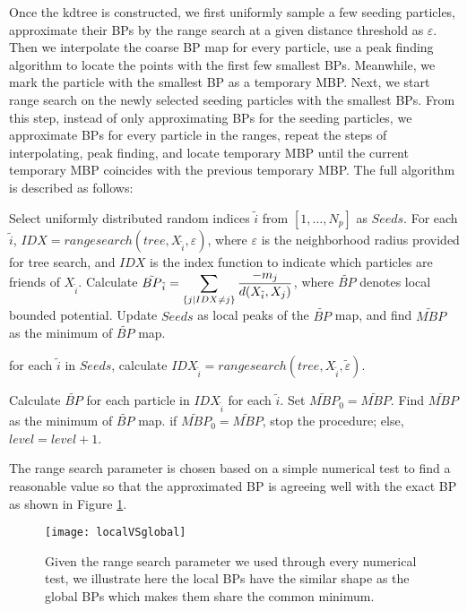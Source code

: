 Once the kdtree is constructed, we first uniformly sample a few seeding particles, approximate their BPs by the range search at a given distance threshold as $\varepsilon$. Then we interpolate the coarse BP map for every particle, use a peak finding algorithm to locate the points with the first few smallest BPs. Meanwhile, we mark the particle with the smallest BP as a temporary MBP. Next, we start range search on the newly selected seeding particles with the smallest BPs. From this step, instead of only approximating BPs for the seeding particles, we approximate BPs for every particle in the ranges, repeat the steps of interpolating, peak finding, and locate temporary MBP until the current temporary MBP coincides with the previous temporary MBP. The full algorithm is described as follows: 
\begin{algorithmic}[h]
\State Select uniformly distributed random indices $\tilde{i}$ from $[1,\dots,N_p]$ as $Seeds$.
\State For each $\tilde{i}$, $IDX=rangesearch(tree,X_{\tilde{i}},\varepsilon)$, where $\varepsilon$ is the neighborhood radius provided for tree search, and $IDX$ is the index function to indicate which particles are friends of $X_{\tilde{i}}$. Calculate $\tilde{BP}_{\tilde{i}}=\displaystyle\sum_{\{j|IDX\neq j\}}\frac{-m_j}{d(X_{\tilde{i}},X_j)}$, where $\tilde{BP}$ denotes local bounded potential. 
\State Update $Seeds$ as local peaks of the $\tilde{BP}$ map, and find $\tilde{MBP}$ as the minimum of $\tilde{BP}$ map. 


\State for each $\tilde{i}$ in $Seeds$, calculate $IDX_{\tilde{i}}=rangesearch(tree,X_{\tilde{i}},\tilde{\varepsilon})$.

\State Calculate $\tilde{BP}$ for each particle in $IDX_{\tilde{i}}$ for each $\tilde{i}$.
\State Set $\tilde{MBP}_0=\tilde{MBP}$.
\State Find $\tilde{MBP}$ as the minimum of $\tilde{BP}$ map. 
\State if $\tilde{MBP}_0=\tilde{MBP}$, stop the procedure; else, $level=level+1$.
\EndProcedure
\end{algorithmic} 

The range search parameter is chosen based on a simple numerical test to find a reasonable value so that the approximated BP is agreeing well with the exact BP as shown in Figure \ref{rsthreshold}.

\begin{figure}[ht]
\centering
    \texttt{[image: localVSglobal]}
    \caption{Given the range search parameter we used through every numerical test,  we illustrate here the local BPs have the similar shape as the global BPs which makes them share the common minimum.}
    \label{rsthreshold}
\end{figure}


